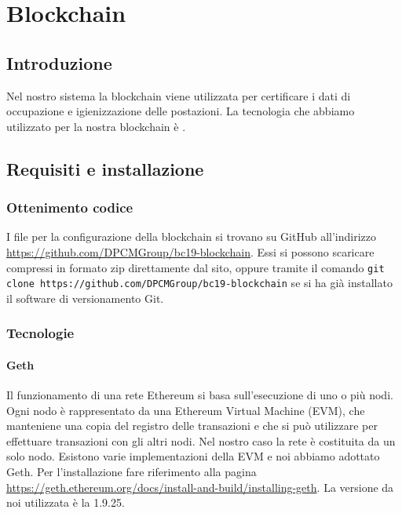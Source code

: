 \section{Blockchain}

\subsection{Introduzione}
Nel nostro sistema la blockchain viene utilizzata per certificare i dati di occupazione e igienizzazione delle postazioni. La tecnologia che abbiamo utilizzato per la nostra blockchain è .

\subsection{Requisiti e installazione}

\subsubsection{Ottenimento codice}
I file per la configurazione della blockchain si trovano su GitHub all'indirizzo \url{https://github.com/DPCMGroup/bc19-blockchain}. Essi si possono scaricare compressi in formato zip direttamente dal sito, oppure tramite il comando \newline
\texttt{git clone https://github.com/DPCMGroup/bc19-blockchain} \newline
se si ha già installato il software di versionamento Git.

\subsubsection{Tecnologie}
\paragraph{Geth}
Il funzionamento di una rete Ethereum si basa sull'esecuzione di uno o più nodi. Ogni nodo è rappresentato da una Ethereum Virtual Machine (EVM), che manteniene una copia del registro delle transazioni e che si può utilizzare per effettuare transazioni con gli altri nodi. Nel nostro caso la rete è costituita da un solo nodo. Esistono varie implementazioni della EVM e noi abbiamo adottato Geth. \newline
Per l'installazione fare riferimento alla pagina \url{https://geth.ethereum.org/docs/install-and-build/installing-geth}. \newline
La versione da noi utilizzata è la 1.9.25.


